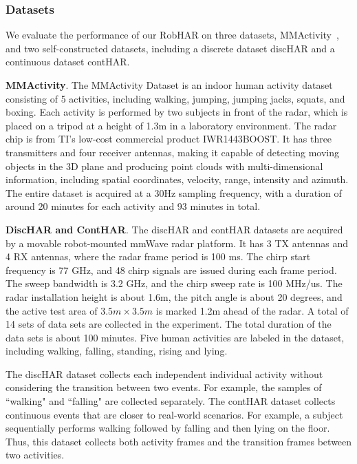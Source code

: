 \subsubsection{Datasets}
We evaluate the performance of our RobHAR on three datasets, MMActivity~\cite{singh2019radhar}, and two self-constructed datasets, including a discrete dataset discHAR and a continuous dataset contHAR. 

\textbf{MMActivity}. The MMActivity Dataset\cite{singh2019radhar} is an indoor human activity dataset consisting of 5 activities, including walking, jumping, jumping jacks, squats, and boxing. 
Each activity is performed by two subjects in front of the radar, which is placed on a tripod at a height of 1.3m in a laboratory environment. 
The radar chip is from TI’s low-cost commercial product IWR1443BOOST. It has three transmitters and four receiver antennas, making it capable of detecting moving objects in the 3D plane and producing point clouds with multi-dimensional information, including spatial coordinates, velocity, range, intensity and azimuth. 
The entire dataset is acquired at a 30Hz sampling frequency, with a duration of around 20 minutes for each activity and 93 minutes in total.


\textbf{DiscHAR and ContHAR}. 
The discHAR and contHAR datasets are acquired by a movable robot-mounted mmWave radar platform. It has 3 TX antennas and 4 RX antennas, where the radar frame period is 100 ms. 
The chirp start frequency is 77 GHz, and 48 chirp signals are issued during each frame period.
The sweep bandwidth is 3.2 GHz, and the chirp sweep rate is 100 MHz/us. 
The radar installation height is about 1.6m, the pitch angle is about 20 degrees, and the active test area of $3.5m \times 3.5m$ is marked 1.2m ahead of the radar. 
A total of 14 sets of data sets are collected in the experiment. 
The total duration of the data sets is about 100 minutes. Five human activities are labeled in the dataset, including walking, falling, standing, rising and lying.

The discHAR dataset collects each independent individual activity without considering the transition between two events. 
For example, the samples of ``walking" and ``falling" are collected separately. 
The contHAR dataset collects continuous events that are closer to real-world scenarios. 
For example, a subject sequentially performs walking followed by falling and then lying on the floor. 
Thus, this dataset collects both activity frames and the transition frames between two activities. 

